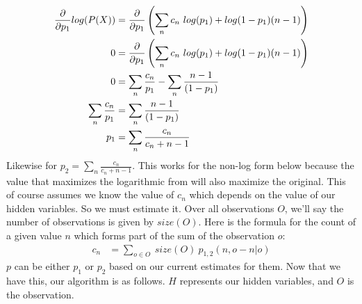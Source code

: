 \documentclass[11pt]{article}
\begin{document}
\begin{align}
\pdv{}{p_1}log(P(X)) &= \pdv{}{p_1}\left(\sum_n c_n \ log(p_1)  + log(1 - p_1)(n - 1)\right) 
\\
0 &= \pdv{}{p_1}\left(\sum_n c_n \ log(p_1)  + log(1 - p_1)(n - 1)\right)
 \\
0 &= \sum_n \frac{c_n}{p_1}  - \sum_n \frac{n - 1}{(1 - p_1)
}\\
\sum_n \frac{c_n}{p_1}  &= \sum_n \frac{n - 1}{(1 - p_1)}
\\
p_1 &= \sum_n \frac{c_n}{c_n + n - 1}\label{p1}
\end{align}
Likewise for $p_2 = \sum_n \frac{c_n}{c_n + n - 1}$. This works for the non-log form below because the value that maximizes the logarithmic from will also maximize the original. This of course assumes we know the value of $c_n$ which depends on the value of our hidden variables. So we must estimate it. Over all observations $O$, we'll say the number of observations is given by $size(O)$. Here is the formula for the count of a given value $n$ which forms part of the sum of the observation $o$:
\begin{align}
c_n &= \sum_{o \in O} \ size(O) \ p_{1,2}(n, o - n | o)\label{cn}
\end{align} 
$p$ can be either $p_1$ or $p_2$ based on our current estimates for them. Now that we have this, our algorithm is as follows. $H$ represents our hidden variables, and $O$ is the observation.
\end{document}
